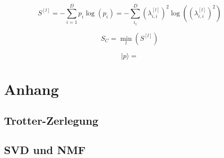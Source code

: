 \documentclass[10pt,a4paper]{report}
\begin{document}
\begin{equation}
S^{[l]}=-\sum_{i=1}^D p_i \log(p_i)=-\sum_{i_1}^D (\lambda_{i,i}^{[l]})^2\log((\lambda_{i,i}^{[l]})^2)
\end{equation}

\begin{equation}
S_C=\min_{l}(S^{[l]})
\end{equation}


\begin{equation}
|p\rangle=
\end{equation}

\chapter{Anhang}
\section{Trotter-Zerlegung}

\section{SVD und NMF}


 

\end{document}
